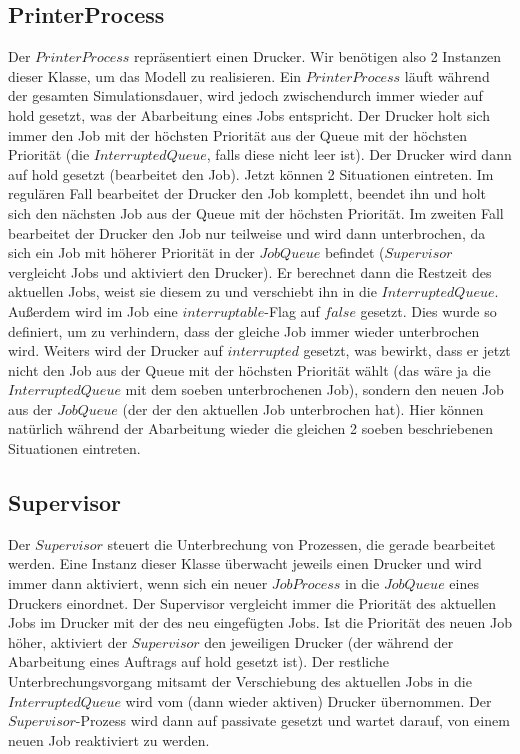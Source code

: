 \documentclass[12pt,a4paper]{article}
\begin{document}
	\subsection{PrinterProcess}
	Der $PrinterProcess$ repräsentiert einen Drucker. Wir benötigen also 2 Instanzen dieser Klasse, um das Modell zu realisieren. Ein $PrinterProcess$ läuft während der gesamten Simulationsdauer, wird
	jedoch zwischendurch immer wieder auf hold gesetzt, was der Abarbeitung eines Jobs entspricht. Der Drucker holt sich immer den Job mit der höchsten Priorität aus der Queue mit der höchsten Priorität (die 
	$InterruptedQueue$, falls diese nicht leer ist). Der Drucker wird dann auf hold gesetzt (bearbeitet den Job). Jetzt können 2 Situationen eintreten. Im regulären Fall bearbeitet der Drucker den Job komplett,
	beendet ihn und holt sich den nächsten Job aus der Queue mit der höchsten Priorität. Im zweiten Fall bearbeitet der Drucker den Job nur teilweise und wird dann unterbrochen, da sich ein Job mit
	höherer Priorität in der $JobQueue$ befindet ($Supervisor$ vergleicht Jobs und aktiviert den Drucker). Er berechnet dann die Restzeit des aktuellen Jobs, weist sie diesem zu und verschiebt ihn in die
	$InterruptedQueue$. Außerdem wird im Job eine $interruptable$-Flag auf $false$ gesetzt. Dies wurde so definiert, um zu verhindern, dass der gleiche Job immer wieder unterbrochen wird. Weiters
	 wird der Drucker auf $interrupted$ gesetzt, was bewirkt, dass er jetzt nicht den Job aus der Queue mit der höchsten Priorität wählt (das wäre ja die $InterruptedQueue$ mit dem soeben unterbrochenen Job),
	 sondern den neuen Job aus der $JobQueue$ (der der den aktuellen Job unterbrochen hat). Hier können natürlich während der Abarbeitung wieder die gleichen 2 soeben beschriebenen Situationen eintreten.
	
	\subsection{Supervisor}
	Der $Supervisor$ steuert die Unterbrechung von Prozessen, die gerade bearbeitet werden. Eine Instanz dieser Klasse überwacht jeweils einen Drucker und wird immer dann aktiviert, wenn sich ein 
	neuer $JobProcess$ in die $JobQueue$ eines Druckers einordnet. Der Supervisor vergleicht immer die Priorität des aktuellen Jobs im Drucker mit der des neu eingefügten Jobs. Ist die Priorität des neuen Job
	höher, aktiviert der $Supervisor$ den jeweiligen Drucker (der während der Abarbeitung eines Auftrags auf hold gesetzt ist). Der restliche Unterbrechungsvorgang mitsamt der Verschiebung des aktuellen Jobs
	in die $InterruptedQueue$ wird vom (dann wieder aktiven) Drucker übernommen. Der $Supervisor$-Prozess wird dann auf passivate gesetzt und wartet darauf, von einem neuen Job reaktiviert zu werden.
	
\end{document}
